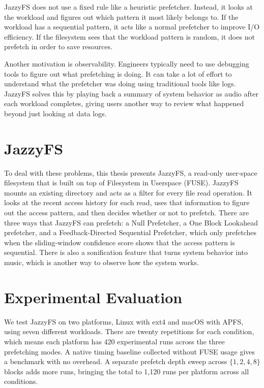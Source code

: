 \documentclass[12pt]{report}
\begin{document}
JazzyFS does not use a fixed rule like a heuristic prefetcher. Instead, it
looks at the workload and figures out which pattern it most likely belongs
to. If the workload has a sequential pattern, it acts like a normal
prefetcher to improve I/O efficiency. If the filesystem sees that the
workload pattern is random, it does not prefetch in order to save resources.

Another motivation is observability. Engineers typically need to use
debugging tools to figure out what prefetching is doing. It can take a lot
of effort to understand what the prefetcher was doing using traditional
tools like logs. JazzyFS solves this by playing back a summary of system behavior as audio
after each workload completes, giving users another way to review what
happened beyond just looking at data logs.

\section{JazzyFS}

To deal with these problems, this thesis presents JazzyFS, a read-only
user-space filesystem that is built on top of Filesystem in Userspace
(FUSE). JazzyFS mounts an existing directory and acts as a filter for every
file read operation. It looks at the recent access history for each read,
uses that information to figure out the access pattern, and then decides
whether or not to prefetch. There are three ways that JazzyFS can prefetch:
a Null Prefetcher, a One Block Lookahead prefetcher, and a
Feedback-Directed Sequential Prefetcher, which only prefetches when the
sliding-window confidence score shows that the access pattern is sequential.
There is also a sonification feature that turns system behavior into music,
which is another way to observe how the system works.

\section{Experimental Evaluation}

We test JazzyFS on two platforms, Linux with ext4 and macOS with APFS,
using seven different workloads. There are twenty repetitions for each
condition, which means each platform has 420 experimental runs across the
three prefetching modes. A native timing baseline collected without FUSE
usage gives a benchmark with no overhead. A separate prefetch depth sweep
across $\{1, 2, 4, 8\}$ blocks adds more runs, bringing the total to
1{,}120 runs per platform across all conditions.
\end{document}

